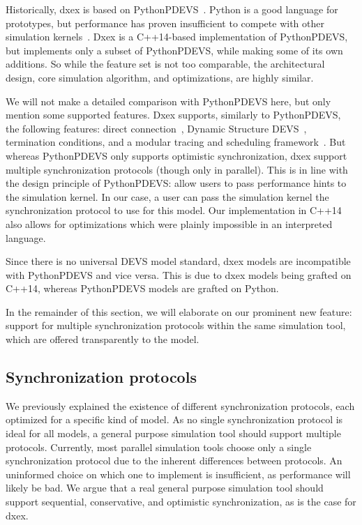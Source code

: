 \newcommand{\plotfraction}{0.85}
Historically, dxex is based on PythonPDEVS~\cite{PythonPDEVS}.
Python is a good language for prototypes, but performance has proven insufficient to compete with other simulation kernels~\cite{MasterThesis}.
Dxex is a C++14-based implementation of PythonPDEVS, but implements only a subset of PythonPDEVS, while making some of its own additions.
So while the feature set is not too comparable, the architectural design, core simulation algorithm, and optimizations, are highly similar.

We will not make a detailed comparison with PythonPDEVS here, but only mention some supported features.
Dxex supports, similarly to PythonPDEVS, the following features: direct connection~\cite{SymbolicFlattening}, \textsf{Dynamic Structure DEVS}~\cite{DSDEVS}, termination conditions, and a modular tracing and scheduling framework~\cite{PythonPDEVS}.
But whereas PythonPDEVS only supports optimistic synchronization, dxex support multiple synchronization protocols (though only in parallel).
This is in line with the design principle of PythonPDEVS: allow users to pass performance hints to the simulation kernel.
In our case, a user can pass the simulation kernel the synchronization protocol to use for this model.
Our implementation in C++14 also allows for optimizations which were plainly impossible in an interpreted language.

Since there is no universal \textsf{DEVS} model standard, dxex models are incompatible with PythonPDEVS and vice versa.
This is due to dxex models being grafted on C++14, whereas PythonPDEVS models are grafted on Python.

In the remainder of this section, we will elaborate on our prominent new feature: support for multiple synchronization protocols within the same simulation tool, which are offered transparently to the model.

\subsection{Synchronization protocols}
We previously explained the existence of different synchronization protocols, each optimized for a specific kind of model.
As no single synchronization protocol is ideal for all models, a general purpose simulation tool should support multiple protocols.
Currently, most parallel simulation tools choose only a single synchronization protocol due to the inherent differences between protocols.
An uninformed choice on which one to implement is insufficient, as performance will likely be bad.
We argue that a real general purpose simulation tool should support sequential, conservative, and optimistic synchronization, as is the case for dxex.

